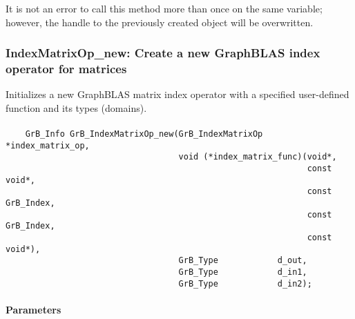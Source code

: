 It is not an error to call this method more than once on the same variable;  
however, the handle to the previously created object will be overwritten. 


\subsubsection{{\sf IndexMatrixOp\_new}: Create a new GraphBLAS index operator for matrices}



Initializes a new GraphBLAS matrix index operator with a specified user-defined 
function and its types (domains).

\paragraph{\syntax}

\begin{verbatim}
    GrB_Info GrB_IndexMatrixOp_new(GrB_IndexMatrixOp  *index_matrix_op,
                                   void (*index_matrix_func)(void*,
                                                             const void*,
                                                             const GrB_Index,
                                                             const GrB_Index,
                                                             const void*),
                                   GrB_Type            d_out,
                                   GrB_Type            d_in1,
                                   GrB_Type            d_in2);
\end{verbatim}

\paragraph{Parameters}


